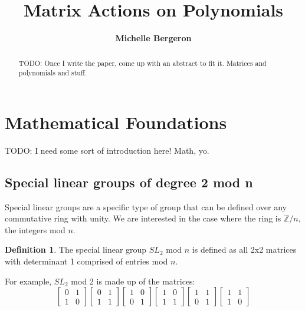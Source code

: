\documentclass[a4paper,draft]{amsproc}
\title[Matrix Actions]{Matrix Actions on Polynomials}
\author[Bergeron]{\bfseries Michelle Bergeron}
\theoremstyle{plain}
\theoremstyle{definition}
\newtheorem{dfn}{Definition}[section]
\theoremstyle{remark}
\numberwithin{equation}{section}
\begin{document}
\vspace{18mm} \setcounter{page}{1} \thispagestyle{empty}


\begin{abstract}
TODO: Once I write the paper, come up with an abstract to fit it. Matrices and polynomials and stuff. 
\end{abstract}

\maketitle

\section{Mathematical Foundations} 

TODO: I need some sort of introduction here! Math, yo. 

\subsection{Special linear groups of degree 2 mod n}
Special linear groups are a specific type of group that can be defined over any commutative ring with unity. We are interested in the case where the ring is $\mathbb{Z}/n$, the integers mod $n$. 
\begin{dfn}
The special linear group $SL_{2}$ mod $n$ is defined as all 2x2 matrices with determinant 1 comprised of entries mod $n$.
\end{dfn}

For example, $SL_{2}$ mod 2 is made up of the matrices:
$$
\begin{bmatrix}
 0&1 \\ 
 1&0 
\end{bmatrix}
\begin{bmatrix}
 0&1 \\ 
 1&1 
\end{bmatrix}
\begin{bmatrix}
 1&0 \\ 
 0&1 
\end{bmatrix}
\begin{bmatrix}
 1&0 \\ 
 1&1 
\end{bmatrix}
\begin{bmatrix}
 1&1 \\ 
 0&1 
\end{bmatrix}
\begin{bmatrix}
 1&1 \\ 
 1&0 
\end{bmatrix}
$$
\end{document}
